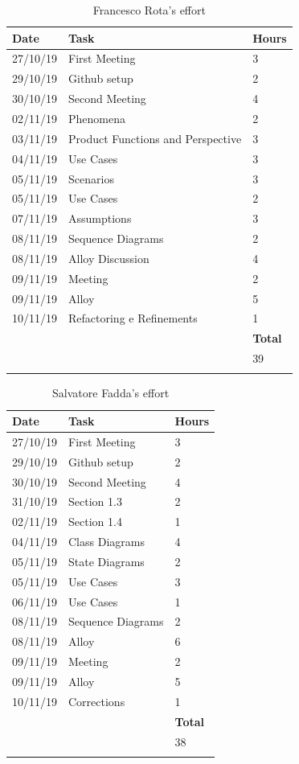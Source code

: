 \documentclass {article}
\begin{document}
\begin{longtable}{| p{2 cm} | p{6 cm} | p{1 cm} |} 
			\hline
			{\bf Date} & {\bf Task} & {\bf Hours}\\
			\hline
			27/10/19 & First Meeting & 3 \\
			\hline
			29/10/19 & Github setup & 2 \\
			\hline
			30/10/19 & Second Meeting & 4 \\
			\hline
			02/11/19 & Phenomena & 2 \\
			\hline
			03/11/19 & Product Functions and Perspective & 3 \\
			\hline
			04/11/19 & Use Cases & 3 \\
			\hline
			05/11/19 & Scenarios & 3 \\
			\hline
			05/11/19 & Use Cases & 2 \\
			\hline
			07/11/19 & Assumptions & 3 \\
			\hline
			08/11/19 & Sequence Diagrams & 2 \\
			\hline
			08/11/19 & Alloy Discussion & 4 \\
			\hline
			09/11/19 & Meeting & 2 \\
			\hline
			09/11/19 & Alloy & 5 \\
			\hline
			10/11/19 & Refactoring e Refinements & 1 \\
			\hline
			& & {\bf Total} \\
			\hline
			& & 39 \\
			\hline
			\caption{Francesco Rota's effort}
\end{longtable}

\begin{longtable}{| p{2 cm} | p{6 cm} | p{1 cm} |} 
			\hline
			{\bf Date} & {\bf Task} & {\bf Hours}\\
			\hline
			27/10/19 & First Meeting & 3 \\
			\hline
			29/10/19 & Github setup & 2 \\
			\hline
			30/10/19 & Second Meeting & 4 \\
			\hline
			31/10/19 & Section 1.3 & 2 \\
			\hline
			02/11/19 & Section 1.4 & 1 \\
			\hline
			04/11/19 & Class Diagrams & 4 \\
			\hline
			05/11/19 & State Diagrams & 2 \\
			\hline
			05/11/19 & Use Cases & 3 \\
			\hline
			06/11/19 & Use Cases & 1 \\
			\hline
			08/11/19 & Sequence Diagrams & 2 \\
			\hline
			08/11/19 & Alloy & 6 \\
			\hline
			09/11/19 & Meeting & 2 \\
			\hline
			09/11/19 & Alloy & 5 \\
			\hline
			10/11/19 & Corrections & 1 \\
			\hline
			& & {\bf Total} \\
			\hline
			& & 38 \\
			\hline
			\caption{Salvatore Fadda's effort}
\end{longtable}

\pagebreak

	
\end{document}
